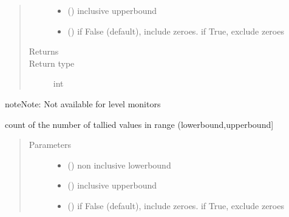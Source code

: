 \documentclass[letterpaper,10pt,english]{sphinxmanual}
\begin{document}
\begin{fulllineitems}
\begin{fulllineitems}
\begin{quote}
\begin{description}
\begin{itemize}
\item {} 
 () \textendash{} inclusive upperbound

\item {} 
 () \textendash{} if False (default), include zeroes. if True, exclude zeroes

\end{itemize}

\item[{Returns}] \leavevmode
{}

\item[{Return type}] \leavevmode
int

\end{description}\end{quote}

\begin{sphinxadmonition}{note}{Note:}
Not available for level monitors
\end{sphinxadmonition}

\end{fulllineitems}


\begin{fulllineitems}
\label{\detokenize{Reference:salabim.Monitor.bin_number_of_entries}}
count of the number of tallied values in range (lowerbound,upperbound{]}
\begin{quote}\begin{description}
\item[{Parameters}] \leavevmode\begin{itemize}
\item {} 
 () \textendash{} non inclusive lowerbound

\item {} 
 () \textendash{} inclusive upperbound

\item {} 
 () \textendash{} if False (default), include zeroes. if True, exclude zeroes


\end{itemize}
\end{description}
\end{quote}
\end{fulllineitems}
\end{fulllineitems}
\end{document}
